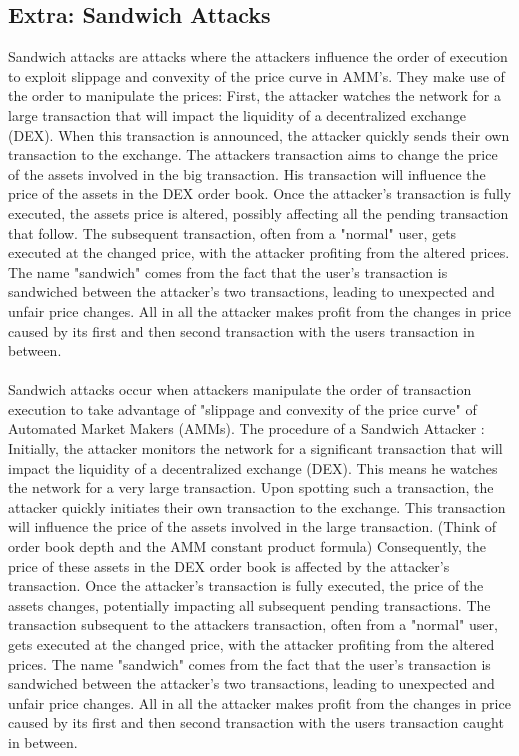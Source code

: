 \documentclass{article}
\begin{document}
\subsection{Extra: Sandwich Attacks}

Sandwich attacks are attacks where the attackers influence the order of execution to exploit slippage and convexity of the price curve in AMM's. They make use of the order to manipulate the prices: First, the attacker watches the network for a large transaction that will impact the liquidity of a decentralized exchange (DEX). When this transaction is announced, the attacker quickly sends their own transaction to the exchange. The attackers transaction aims to change the price of the assets involved in the big transaction. His transaction will influence the price of the assets in the DEX order book. Once the attacker's transaction is fully executed, the assets price is altered, possibly affecting all the pending transaction that follow. The subsequent transaction, often from a "normal" user, gets executed at the changed price, with the attacker profiting from the altered prices. The name "sandwich" comes from the fact that the user's transaction is sandwiched between the attacker's two transactions, leading to unexpected and unfair price changes. All in all the attacker makes profit from the changes in price caused by its first and then second transaction with the users transaction in between.\\
\\
Sandwich attacks occur when attackers manipulate the order of transaction execution to take advantage of "slippage and convexity of the price curve" of Automated Market Makers (AMMs). The procedure of a Sandwich Attacker : Initially, the attacker monitors the network for a significant transaction that will impact the liquidity of a decentralized exchange (DEX). This means he watches the network for a very large transaction.  Upon spotting such a transaction, the attacker quickly initiates their own transaction to the exchange. This transaction will influence the price of the assets involved in the large transaction. (Think of order book depth and the AMM constant product formula) Consequently, the price of these assets in the DEX order book is affected by the attacker's transaction. Once the attacker's transaction is fully executed, the price of the assets changes, potentially impacting all subsequent pending transactions. The transaction subsequent to the attackers transaction, often from a "normal" user, gets executed at the changed price, with the attacker profiting from the altered prices. The name "sandwich" comes from the fact that the user's transaction is sandwiched between the attacker's two transactions, leading to unexpected and unfair price changes. All in all the attacker makes profit from the changes in price caused by its first and then second transaction with the users transaction caught in between.\\ 
\end{document}
